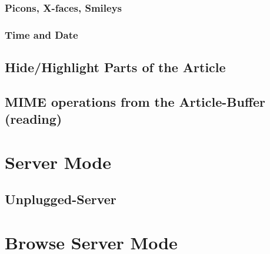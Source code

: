 \documentclass{article}
\begin{document}
    \subsubsection*{Picons, X-faces, Smileys}
    \Picons
    \subsubsection*{Time and Date}
    \TimeAndDate
    \subsection*{Hide/Highlight Parts of the Article}
    \HideHighlightArticle
    \subsection*{MIME operations from the Article-Buffer (reading)}
    \MIMEArticleMode
%
%
\section*{Server Mode}
\ServerMode
    \subsection*{Unplugged-Server}
    \ServerUnplugged
%
%
\section*{Browse Server Mode}
\BrowseServer

\vspace*{\fill}
\Copyright
\end{document}
